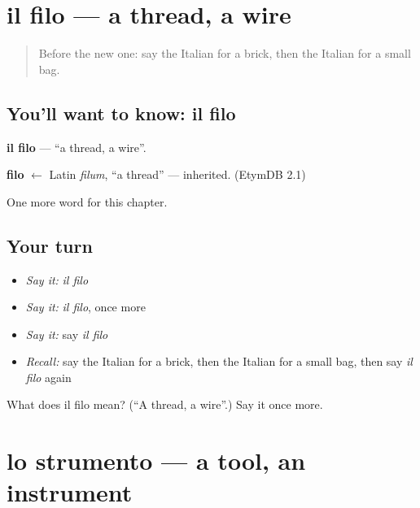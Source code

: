 \section[il filo]{il filo — a thread, a wire}

\label{lesson:IT-C257-filo}



\begin{quote}
Before the new one: say the Italian for a brick, then the Italian for a small bag.
\end{quote}

\subsection*{You'll want to know: il filo}
\textbf{il filo} — \textquotedblleft{}a thread, a wire\textquotedblright{}.

\begin{cousinweb}
\textbf{filo} $\leftarrow$ Latin \emph{filum}, \textquotedblleft{}a thread\textquotedblright{} — inherited. (EtymDB 2.1)
\end{cousinweb}

\begin{grammarlens}[title={What you've built}]
One more word for this chapter.
\end{grammarlens}

\subsection*{Your turn}
\begin{itemize}
\raggedright
  \item \emph{Say it:} \emph{il filo}
  \item \emph{Say it:} \emph{il filo}, once more
  \item \emph{Say it:} say \emph{il filo}
  \item \emph{Recall:} say the Italian for a brick, then the Italian for a small bag, then say \emph{il filo} again
\end{itemize}

\begin{tcolorbox}[breakable,colback=teal!4,colframe=teal!35!black,title={Before you move on}]
What does il filo mean? (\textquotedblleft{}A thread, a wire\textquotedblright{}.) Say it once more.
\end{tcolorbox}
\section[lo strumento]{lo strumento — a tool, an instrument}

